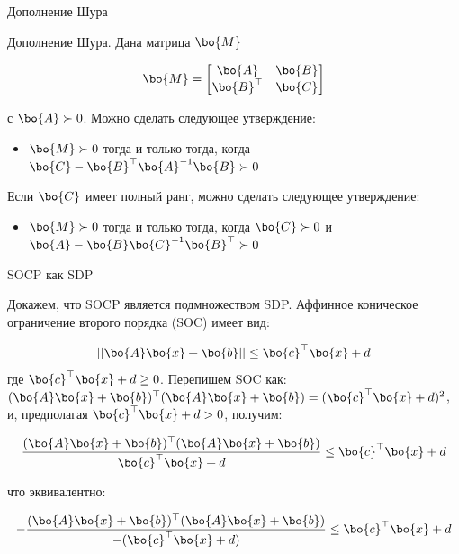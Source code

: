 \documentclass{beamer}
\begin{document}
\begin{frame}{Дополнение Шура}
	\begin{flushleft}
		
		Дополнение Шура. Дана матрица $\bo{M}$
		
		\begin{equation}
			\bo{M} = 
			\begin{bmatrix}
				\bo{A} & \bo{B} \\
				\bo{B}^\top & \bo{C}
			\end{bmatrix}
		\end{equation}
		
		с $\bo{A} \succ 0$. Можно сделать следующее утверждение:
		
		\begin{itemize}
			\item $\bo{M} \succ 0$ тогда и только тогда, когда $\bo{C} - \bo{B}^\top\bo{A}^{-1}\bo{B} \succ 0$
		\end{itemize}
		
		\bigskip
		
		Если $\bo{C}$ имеет полный ранг, можно сделать следующее утверждение:
		
		\begin{itemize}
			\item $\bo{M} \succ 0$ тогда и только тогда, когда $\bo{C} \succ 0$ и $\bo{A} - \bo{B}\bo{C}^{-1}\bo{B}^\top \succ 0$
		\end{itemize}		
		
	\end{flushleft}
\end{frame}

\begin{frame}{SOCP как SDP}
	\begin{flushleft}
		
		Докажем, что SOCP является подмножеством SDP. Аффинное коническое ограничение второго порядка (SOC) имеет вид:
		
		\begin{equation}
			||\bo{A}\bo{x} + \bo{b}|| \leq \bo{c}^\top \bo{x} + d
		\end{equation}
		где $\bo{c}^\top \bo{x} + d \geq 0$. Перепишем SOC как: $(\bo{A}\bo{x} + \bo{b})^\top (\bo{A}\bo{x} + \bo{b}) = (\bo{c}^\top \bo{x} + d)^2$, и, предполагая $\bo{c}^\top \bo{x} + d > 0$, получим:
		
		\begin{equation}
			\frac{(\bo{A}\bo{x} + \bo{b})^\top (\bo{A}\bo{x} + \bo{b})}{\bo{c}^\top \bo{x} + d} \leq \bo{c}^\top \bo{x} + d
		\end{equation}
		
		что эквивалентно:
		
		\begin{equation}
			-\frac{(\bo{A}\bo{x} + \bo{b})^\top (\bo{A}\bo{x} + \bo{b})}{-(\bo{c}^\top \bo{x} + d)} \leq \bo{c}^\top \bo{x} + d
		\end{equation}
		
	\end{flushleft}
\end{frame}
\end{document}
